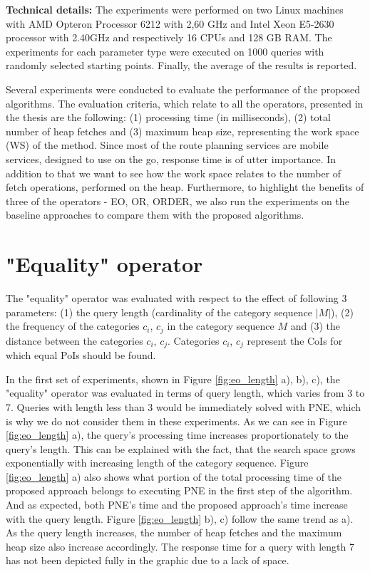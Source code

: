 \textbf{Technical details:}
The experiments were performed on two Linux machines with AMD Opteron Processor 6212 with 2,60 GHz and Intel Xeon E5-2630 processor with 2.40GHz and respectively 16 CPUs and 128 GB RAM. The experiments for each parameter type were executed on 1000 queries with randomly selected starting points. Finally, the average of the results is reported.

Several experiments were conducted to evaluate the performance of the proposed algorithms. The evaluation criteria, which relate to all the operators, presented in the thesis are the following: (1) processing time (in milliseconds), (2) total number of heap fetches and (3) maximum heap size, representing the work space (WS) of the method. Since most of the route planning services are mobile services, designed to use on the go, response time is of utter importance. In addition to that we want to see how the work space relates to the number of fetch operations, performed on the heap. Furthermore, to highlight the benefits of three of the operators - EO, OR, ORDER, we also run the experiments on the baseline approaches to compare them with the proposed algorithms. 

\section{"Equality" operator}
\label{sec:experimentsEO}

The "equality" operator was evaluated with respect to the effect of following 3 parameters: (1) the query length (cardinality of the category sequence $|M|$), (2) the frequency of the categories $c_i$, $c_j$ in the category sequence $M$ and (3) the distance between the categories $c_i$, $c_j$. Categories $c_i$, $c_j$ represent the CoIs for which equal PoIs should be found.

In the first set of experiments, shown in Figure \ref{fig:eo_length} a), b), c), the "equality" operator was evaluated in terms of query length, which varies from 3 to 7. Queries with length less than 3 would be immediately solved with PNE, which is why we do not consider them in these experiments. 
As we can see in Figure \ref{fig:eo_length} a), the query's processing time increases proportionately to the query's length. This can be explained with the fact, that the search space grows exponentially with increasing length of the category sequence. Figure \ref{fig:eo_length} a) also shows what portion of the total processing time of the proposed approach belongs to executing PNE in the first step of the algorithm. And as expected, both PNE's time and the proposed approach's time increase with the query length. Figure \ref{fig:eo_length} b), c) follow the same trend as a). As the query length increases, the number of heap fetches and the maximum heap size also increase accordingly. The response time for a query with length 7 has not been depicted fully in the graphic due to a lack of space.

